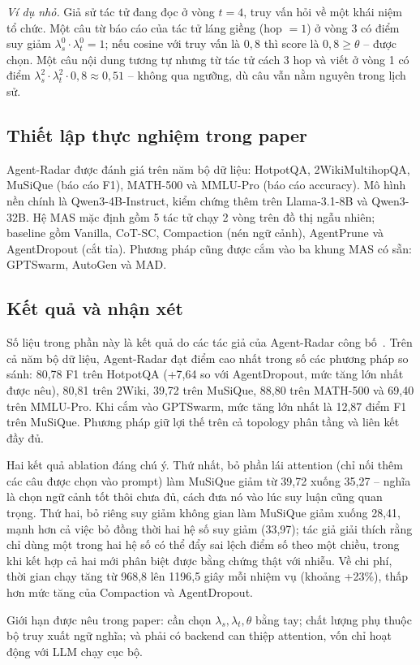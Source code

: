 \emph{Ví dụ nhỏ.} Giả sử tác tử đang đọc ở vòng $t=4$, truy vấn hỏi về một khái niệm tổ chức. Một câu từ báo cáo của tác tử láng giềng (hop $=1$) ở vòng 3 có điểm suy giảm $\lambda_s^0 \cdot \lambda_t^0 = 1$; nếu cosine với truy vấn là $0{,}8$ thì score là $0{,}8 \ge \theta$ -- được chọn. Một câu nội dung tương tự nhưng từ tác tử cách 3 hop và viết ở vòng 1 có điểm $\lambda_s^2 \cdot \lambda_t^2 \cdot 0{,}8 \approx 0{,}51$ -- không qua ngưỡng, dù câu vẫn nằm nguyên trong lịch sử.

\subsection{Thiết lập thực nghiệm trong paper}
Agent-Radar được đánh giá trên năm bộ dữ liệu: HotpotQA, 2WikiMultihopQA, MuSiQue (báo cáo F1), MATH-500 và MMLU-Pro (báo cáo accuracy). Mô hình nền chính là Qwen3-4B-Instruct, kiểm chứng thêm trên Llama-3.1-8B và Qwen3-32B. Hệ MAS mặc định gồm 5 tác tử chạy 2 vòng trên đồ thị ngẫu nhiên; baseline gồm Vanilla, CoT-SC, Compaction (nén ngữ cảnh), AgentPrune và AgentDropout (cắt tỉa). Phương pháp cũng được cắm vào ba khung MAS có sẵn: GPTSwarm, AutoGen và MAD.

\subsection{Kết quả và nhận xét}
Số liệu trong phần này là kết quả do các tác giả của Agent-Radar công bố~\cite{agentradar2026}. Trên cả năm bộ dữ liệu, Agent-Radar đạt điểm cao nhất trong số các phương pháp so sánh: 80,78 F1 trên HotpotQA (+7,64 so với AgentDropout, mức tăng lớn nhất được nêu), 80,81 trên 2Wiki, 39,72 trên MuSiQue, 88,80 trên MATH-500 và 69,40 trên MMLU-Pro. Khi cắm vào GPTSwarm, mức tăng lớn nhất là 12,87 điểm F1 trên MuSiQue. Phương pháp giữ lợi thế trên cả topology phân tầng và liên kết đầy đủ.

Hai kết quả ablation đáng chú ý. Thứ nhất, bỏ phần lái attention (chỉ nối thêm các câu được chọn vào prompt) làm MuSiQue giảm từ 39,72 xuống 35,27 -- nghĩa là chọn ngữ cảnh tốt thôi chưa đủ, cách đưa nó vào lúc suy luận cũng quan trọng. Thứ hai, bỏ riêng suy giảm không gian làm MuSiQue giảm xuống 28,41, mạnh hơn cả việc bỏ đồng thời hai hệ số suy giảm (33,97); tác giả giải thích rằng chỉ dùng một trong hai hệ số có thể đẩy sai lệch điểm số theo một chiều, trong khi kết hợp cả hai mới phân biệt được bằng chứng thật với nhiễu. Về chi phí, thời gian chạy tăng từ 968,8 lên 1196,5 giây mỗi nhiệm vụ (khoảng +23\%), thấp hơn mức tăng của Compaction và AgentDropout.

Giới hạn được nêu trong paper: cần chọn $\lambda_s, \lambda_t, \theta$ bằng tay; chất lượng phụ thuộc bộ truy xuất ngữ nghĩa; và phải có backend can thiệp attention, vốn chỉ hoạt động với LLM chạy cục bộ.
